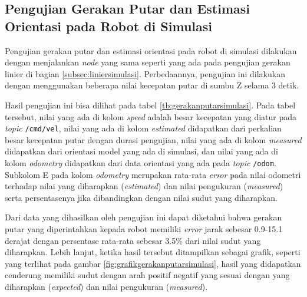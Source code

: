 \subsection{Pengujian Gerakan Putar dan Estimasi Orientasi pada Robot di Simulasi}
\label{subsec:putarsimulasi}

Pengujian gerakan putar dan estimasi orientasi pada robot di simulasi dilakukan dengan menjalankan \emph{node} yang sama seperti yang ada pada pengujian gerakan linier di bagian \ref{subsec:liniersimulasi}.
Perbedaannya, pengujian ini dilakukan dengan menggunakan beberapa nilai kecepatan putar di sumbu Z selama 3 detik.



Hasil pengujian ini bisa dilihat pada tabel \ref{tb:gerakanputarsimulasi}.
Pada tabel tersebut, nilai yang ada di kolom \emph{speed} adalah besar kecepatan yang diatur pada \emph{topic} \lstinline{/cmd/vel},
  nilai yang ada di kolom \emph{estimated} didapatkan dari perkalian besar kecepatan putar dengan durasi pengujian,
  nilai yang ada di kolom \emph{measured} didapatkan dari orientasi model yang ada di simulasi,
  dan nilai yang ada di kolom \emph{odometry} didapatkan dari data orientasi yang ada pada \emph{topic} \lstinline{/odom}.
Subkolom E pada kolom \emph{odometry} merupakan rata-rata \emph{error} pada nilai odometri terhadap nilai yang diharapkan (\emph{estimated}) dan nilai pengukuran (\emph{measured}) serta persentasenya jika dibandingkan dengan nilai sudut yang diharapkan.



Dari data yang dihasilkan oleh pengujian ini dapat diketahui bahwa gerakan putar yang diperintahkan kepada robot memiliki \emph{error} jarak sebesar 0.9-15.1 derajat dengan persentase rata-rata sebesar 3.5\% dari nilai sudut yang diharapkan.
Lebih lanjut, ketika hasil tersebut ditampilkan sebagai grafik,
  seperti yang terlihat pada gambar \ref{fig:grafikgerakanputarsimulasi},
  hasil yang didapatkan cenderung memiliki sudut dengan arah positif negatif yang sesuai dengan yang diharapkan (\emph{expected}) dan nilai pengukuran (\emph{measured}).

